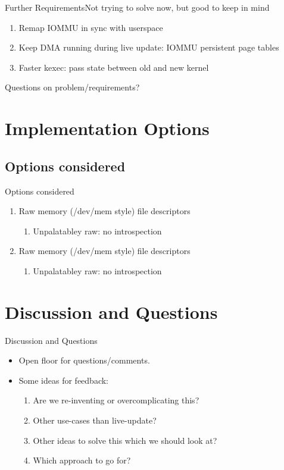 \documentclass{beamer}
\begin{document}
\begin{frame}{Further Requirements}{Not trying to solve now, but good to keep in mind}
  \begin{enumerate}
    \item Remap IOMMU in sync with userspace
    \item Keep DMA running during live update: IOMMU persistent page tables
    \item Faster kexec: pass state between old and new kernel
  \end{enumerate}
  \break
  Questions on problem/requirements?
\end{frame}

\section{Implementation Options}

\subsection{Options considered}
\begin{frame}{Options considered}
  \begin{enumerate}
    \item Raw memory (/dev/mem style) file descriptors
      \begin{enumerate}
        \item Unpalatabley raw: no introspection
      \end{enumerate}
    \item Raw memory (/dev/mem style) file descriptors
      \begin{enumerate}
        \item Unpalatabley raw: no introspection
      \end{enumerate}
  \end{enumerate}
\end{frame}


\section{Discussion and Questions}

\begin{frame}{Discussion and Questions}
  \begin{itemize}
    \item Open floor for questions/comments.
    \item Some ideas for feedback:
      \begin{enumerate}
        \item Are we re-inventing or overcomplicating this?
        \item Other use-cases than live-update?
        \item Other ideas to solve this which we should look at?
        \item Which approach to go for?
      \end{enumerate}
  \end{itemize}
\end{frame}
\end{document}
